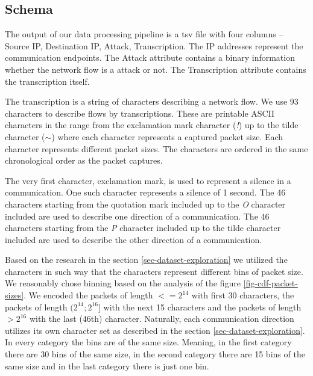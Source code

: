\documentclass{article}
\begin{document}
    \subsection{Schema}\label{sec-schema}
    The output of our data processing pipeline is a tsv file with four columns -- Source IP, Destination IP, Attack, Transcription. The IP addresses represent the communication endpoints. The Attack attribute contains a binary information whether the network flow is a attack or not. The Transcription attribute contains the transcription itself.

    The transcription is a string of characters describing a network flow. We use 93 characters to describe flows by transcriptions. These are printable ASCII characters in the range from the exclamation mark character (\textit{!}) up to the tilde character (\textit{$\sim$}) where each character represents a captured packet size. Each character represents different packet sizes. The characters are ordered in the same chronological order as the packet captures.

    The very first character, exclamation mark, is used to represent a silence in a communication. One such character represents a silence of 1 second. The 46 characters starting from the quotation mark included up to the \textit{O} character included are used to describe one direction of a communication. The 46 characters starting from the \textit{P} character included up to the tilde character included are used to describe the other direction of a communication.

    Based on the research in the section \ref{sec-dataset-exploration} we utilized the characters in such way that the characters represent different bins of packet size. We reasonably chose binning based on the analysis of the figure \ref{fig-cdf-packet-sizes}. We encoded the packets of length $<= 2^{14}$ with first 30 characters, the packets of length $(2^{14}; 2^{16}]$ with the next 15 characters and the packets of length $> 2^{16}$ with the last (46th) character. Naturally, each communication direction utilizes its own character set as described in the section \ref{sec-dataset-exploration}. In every category the bins are of the same size. Meaning, in the first category there are 30 bins of the same size, in the second category there are 15 bins of the same size and in the last category there is just one bin.
\end{document}
